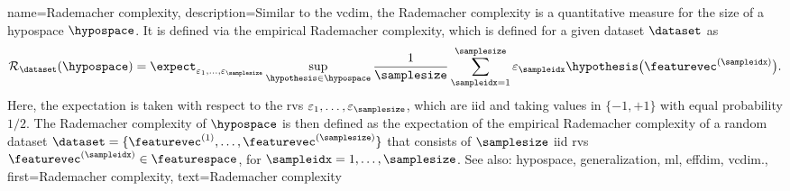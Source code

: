 {name={Rademacher complexity},
 	description={Similar to the \gls{vcdim}, the  Rademacher 
	complexity \cite{bartlett2002rademacher} is a quantitative measure 
	for the size of a \gls{hypospace} $\hypospace$. It is defined via the 
	empirical Rademacher complexity, which is defined for a given \gls{dataset} 
	$\dataset$ as
	\begin{equation}
    \mathcal{R}_\dataset(\hypospace) 
    = 
    \expect_{\varepsilon_{1},\ldots,\varepsilon_{\samplesize} } 
	\sup_{\hypothesis \in \hypospace} \frac{1}{\samplesize} \sum_{\sampleidx=1}^\samplesize \varepsilon_\sampleidx 
	\hypothesis\big(\featurevec^{(\sampleidx)} \big).
    \label{eq:def_emprical_rademacher_complexity_hypothesis_dict}
    \end{equation}
	Here, the \gls{expectation} is taken with respect to 
	the \glspl{rv} $\varepsilon_{1},\ldots,\varepsilon_{\samplesize}$,
	which are \gls{iid} and taking values in $\{ -1, +1 \}$ with equal 
	\gls{probability} $1/2$. The Rademacher complexity of $\hypospace$ is 
	then defined as the \gls{expectation} of the empirical Rademacher complexity 
	of a random \gls{dataset} $\dataset = \{\featurevec^{(1)}, \hdots, \featurevec^{(\samplesize)}\}$
	that consists of $\samplesize$ \gls{iid} \glspl{rv} $\featurevec^{(\sampleidx)} \in \featurespace$, 
	for $\sampleidx=1,\ldots,\samplesize$.  
        See also: \gls{hypospace},  \gls{generalization}, \gls{ml}, \gls{effdim}, \gls{vcdim}.},
	first={Rademacher complexity},
	text={Rademacher complexity}  
}

